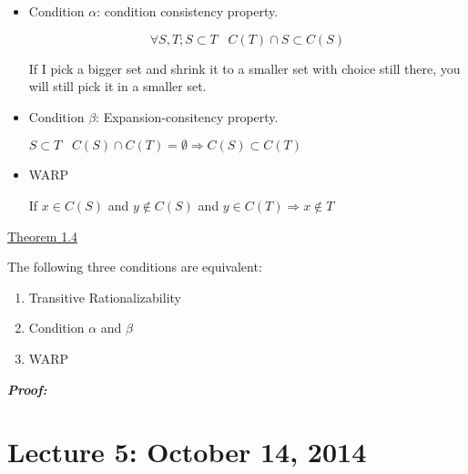 \documentclass{article}
\begin{document}
\begin{itemize}

\item 
Condition $\alpha$: condition consistency property.

\[
\forall S,T; S\subset T \;\;\;C(T) \cap S \subset C(S)
\]

If I pick a bigger set and shrink it to a smaller set with choice still there, you will still pick it in a smaller set.

\item 
Condition $\beta$: Expansion-consitency property.

$S \subset T  \;\;\; C(S)\cap C(T) = \emptyset \Rightarrow C(S) \subset C(T) $


\item WARP

If $x\in C(S)$ and $y \not \in C(S)$ and $y \in C(T) \Rightarrow x \not \in T$ 

\end{itemize}


\underline{Theorem 1.4}

The following three conditions are equivalent:

\begin{enumerate}

\item Transitive Rationalizability
\item Condition $\alpha$ and $\beta$
\item WARP
\end{enumerate}

\textbf{\emph{Proof:}}

\section*{Lecture 5: October 14, 2014}
 
\end{document}
